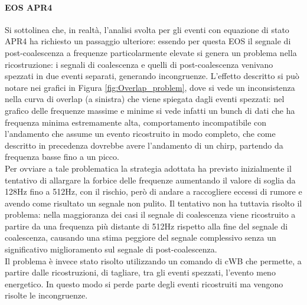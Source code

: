 \paragraph{EOS APR4} Si sottolinea che, in realtà, l'analisi svolta per gli eventi con equazione di stato APR4 ha richiesto un passaggio ulteriore: essendo per questa EOS il segnale di post-coalescenza a frequenze particolarmente elevate si genera un problema nella ricostruzione: i segnali di coalescenza e quelli di post-coalescenza venivano spezzati in due eventi separati, generando incongruenze. L'effetto descritto si può notare nei grafici in Figura \ref{fig:Overlap_problem}, dove si vede un inconsistenza nella curva di overlap (a sinistra) che viene spiegata dagli eventi spezzati: nel grafico delle frequenze massime e minime si vede infatti un bunch di dati che ha frequenza minima estremamente alta, comportamento incompatibile con l'andamento che assume un evento ricostruito in modo completo, che come descritto in precedenza dovrebbe avere l'andamento di un chirp, partendo da frequenza basse fino a un picco.\\
Per ovviare a tale problematica la strategia adottata ha previsto inizialmente il tentativo di allargare la forbice delle frequenze aumentando il valore di soglia da 128Hz fino a 512Hz, con il rischio, però di andare a raccogliere eccessi di rumore e avendo come risultato un segnale non pulito. Il tentativo non ha tuttavia risolto il problema: nella maggioranza dei casi il segnale di coalescenza viene ricostruito a partire da una frequenza più distante di 512Hz rispetto alla fine del segnale di coalescenza, causando una stima peggiore del segnale complessivo senza un significativo miglioramento sul segnale di post-coalescenza. \\
Il problema è invece stato risolto utilizzando un comando di cWB che permette, a partire dalle ricostruzioni, di tagliare, tra gli eventi spezzati, l'evento meno energetico. In questo modo si perde parte degli eventi ricostruiti ma vengono risolte le incongruenze.
